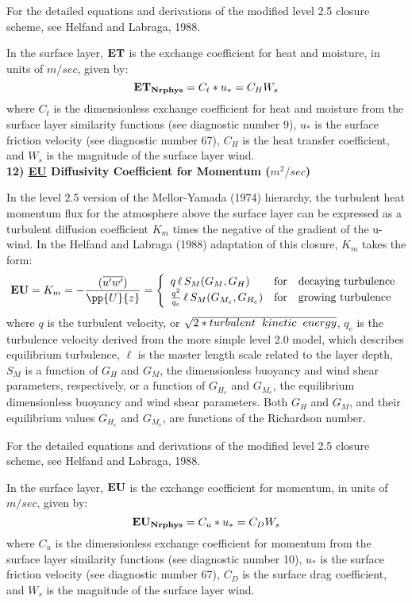 \noindent
For the detailed equations and derivations of the modified level 2.5 closure scheme,
see Helfand and Labraga, 1988.

\noindent
In the surface layer, ${\bf {ET}}$ is the exchange coefficient for heat and moisture,
in units of $m/sec$, given by:
\[
{\bf ET_{Nrphys}} =  C_t * u_* = C_H W_s
\]
\noindent
where $C_t$ is the dimensionless exchange coefficient for heat and moisture from the 
surface layer similarity functions (see diagnostic number 9), $u_*$ is the surface 
friction velocity (see diagnostic number 67), $C_H$ is the heat transfer coefficient,
and $W_s$ is the magnitude of the surface layer wind.
\\
 
\noindent
{\bf 12)  \underline {EU}  Diffusivity Coefficient for Momentum ($m^2/sec$) }
 
\noindent  
In the level 2.5 version of the Mellor-Yamada (1974) hierarchy, the turbulent heat
momentum flux for the atmosphere above the surface layer can be expressed as a turbulent
diffusion coefficient $K_m$ times the negative of the gradient of the u-wind.
In the Helfand and Labraga (1988) adaptation of this closure, $K_m$
takes the form:
\[
{\bf EU} = K_m = -{( {\overline{u^{\prime}w^{\prime}}}) \over {\pp{U}{z}} }
 = \left\{ \begin{array}{l@{\quad\mbox{for}\quad}l} q \, \ell \, S_M(G_M,G_H) & \mbox{decaying turbulence}
\\ { q^2 \over {q_e} } \, \ell \, S_{M}(G_{M_e},G_{H_e}) & \mbox{growing turbulence} \end{array} \right.
\]
\noindent
where $q$ is the turbulent velocity, or $\sqrt{2*turbulent \hspace{.2cm} kinetic \hspace{.2cm}
energy}$, $q_e$ is the turbulence velocity derived from the more simple level 2.0 model,
which describes equilibrium turbulence, $\ell$ is the master length scale related to the layer
depth, 
$S_M$ is a function of $G_H$ and $G_M$, the dimensionless buoyancy and
wind shear parameters, respectively, or a function of $G_{H_e}$ and $G_{M_e}$, the equilibrium 
dimensionless buoyancy and wind shear
parameters.   Both $G_H$ and $G_M$, and their equilibrium values $G_{H_e}$ and $G_{M_e}$, 
are functions of the Richardson number.

\noindent
For the detailed equations and derivations of the modified level 2.5 closure scheme,
see Helfand and Labraga, 1988.
 
\noindent
In the surface layer, ${\bf {EU}}$ is the exchange coefficient for momentum,
in units of $m/sec$, given by:
\[
{\bf EU_{Nrphys}} = C_u * u_* = C_D W_s
\]
\noindent
where $C_u$ is the dimensionless exchange coefficient for momentum from the surface layer 
similarity functions (see diagnostic number 10), $u_*$ is the surface friction velocity 
(see diagnostic number 67), $C_D$ is the surface drag coefficient, and $W_s$ is the 
magnitude of the surface layer wind.
\\
 
